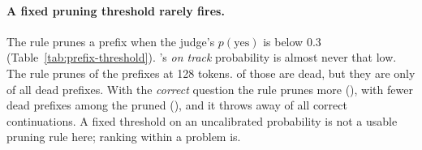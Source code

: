 \paragraph{A fixed pruning threshold rarely fires.} The rule prunes a prefix when the judge's
$p(\text{yes})$ is below 0.3 (Table~\ref{tab:prefix-threshold}). \kev{}'s \emph{on track} probability is almost never that
low. The rule prunes  of the prefixes at 128 tokens.  of those are
dead, but they are only  of all dead prefixes. With the \emph{correct} question the rule
prunes more (), with fewer dead prefixes among the pruned (),
and it throws away  of all correct continuations. A fixed threshold on an uncalibrated
probability is not a usable pruning rule here; ranking within a problem is.

\begin{table}[t]
\centering\small

\caption{The threshold rule, prune when $p(\text{yes})<0.3$: the fraction of prefixes pruned, the fraction of the pruned that
were dead, and the fraction of all correct continuations that the pruned prefixes would have produced.}
\label{tab:prefix-threshold}
\end{table}
